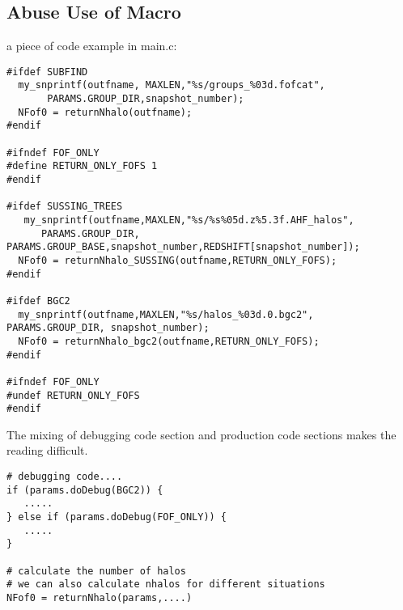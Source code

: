 \documentclass[notheorems, aspectratio=54]{beamer}
\begin{document}
\subsection{Abuse Use of Macro}
\begin{frame}[fragile]

a piece of code example in main.c:
 \begin{verbatim}
#ifdef SUBFIND
  my_snprintf(outfname, MAXLEN,"%s/groups_%03d.fofcat", 
       PARAMS.GROUP_DIR,snapshot_number);    
  NFof0 = returnNhalo(outfname);
#endif

#ifndef FOF_ONLY
#define RETURN_ONLY_FOFS 1  
#endif
   
#ifdef SUSSING_TREES
   my_snprintf(outfname,MAXLEN,"%s/%s%05d.z%5.3f.AHF_halos", 
      PARAMS.GROUP_DIR, PARAMS.GROUP_BASE,snapshot_number,REDSHIFT[snapshot_number]);
  NFof0 = returnNhalo_SUSSING(outfname,RETURN_ONLY_FOFS);
#endif

#ifdef BGC2
  my_snprintf(outfname,MAXLEN,"%s/halos_%03d.0.bgc2",  PARAMS.GROUP_DIR, snapshot_number);
  NFof0 = returnNhalo_bgc2(outfname,RETURN_ONLY_FOFS);
#endif  

#ifndef FOF_ONLY  
#undef RETURN_ONLY_FOFS
#endif
 \end{verbatim}

 The mixing of debugging code section and production code sections makes the reading difficult.
 
\end{frame}

\begin{frame}[fragile]

\begin{verbatim}
# debugging code....
if (params.doDebug(BGC2)) {
   .....
} else if (params.doDebug(FOF_ONLY)) {
   .....
}

# calculate the number of halos
# we can also calculate nhalos for different situations
NFof0 = returnNhalo(params,....)
\end{verbatim}

\end{frame}


\end{document}
